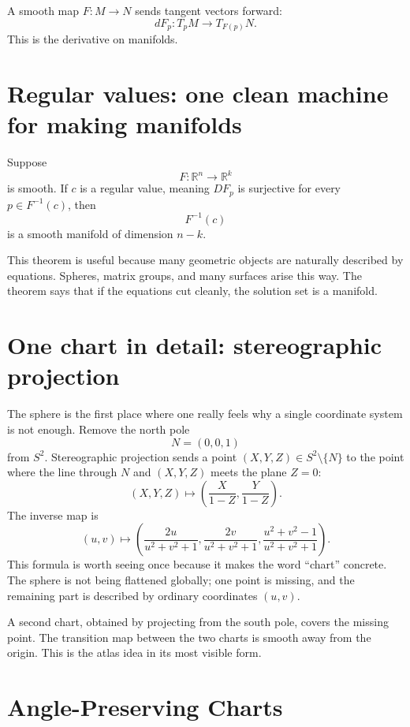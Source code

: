 A smooth map \(F:M\to N\) sends tangent vectors forward:
\[
  dF_p:T_pM\to T_{F(p)}N.
\]
This is the derivative on manifolds.

\section{Regular values: one clean machine for making manifolds}

Suppose
\[
  F:\mathbb R^n\to\mathbb R^k
\]
is smooth. If \(c\) is a regular value, meaning \(DF_p\) is surjective for every \(p\in F^{-1}(c)\), then
\[
  F^{-1}(c)
\]
is a smooth manifold of dimension \(n-k\).

This theorem is useful because many geometric objects are naturally described by equations. Spheres, matrix groups, and many surfaces arise this way. The theorem says that if the equations cut cleanly, the solution set is a manifold.


\section{One chart in detail: stereographic projection}

The sphere is the first place where one really feels why a single coordinate system is not enough.  Remove the north pole
\[
  N=(0,0,1)
\]
from \(S^2\).  Stereographic projection sends a point \((X,Y,Z)\in S^2\setminus\{N\}\) to the point where the line through \(N\) and \((X,Y,Z)\) meets the plane \(Z=0\):
\[
  (X,Y,Z)\longmapsto \left(\frac{X}{1-Z},\frac{Y}{1-Z}\right).
\]
The inverse map is
\[
  (u,v)\longmapsto
  \left(
  \frac{2u}{u^2+v^2+1},
  \frac{2v}{u^2+v^2+1},
  \frac{u^2+v^2-1}{u^2+v^2+1}
  \right).
\]
This formula is worth seeing once because it makes the word ``chart'' concrete.  The sphere is not being flattened globally; one point is missing, and the remaining part is described by ordinary coordinates \((u,v)\).

A second chart, obtained by projecting from the south pole, covers the missing point.  The transition map between the two charts is smooth away from the origin.  This is the atlas idea in its most visible form.

\section{Angle-Preserving Charts}

